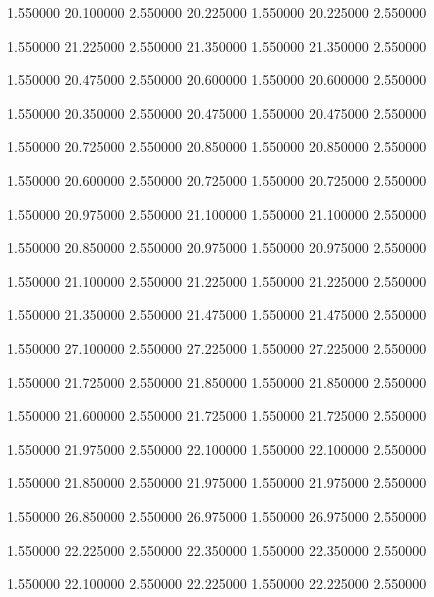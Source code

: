  {1.550000} {20.100000} {2.550000} {20.225000} {1.550000} {20.225000} {2.550000}

 {1.550000} {21.225000} {2.550000} {21.350000} {1.550000} {21.350000} {2.550000}

 {1.550000} {20.475000} {2.550000} {20.600000} {1.550000} {20.600000} {2.550000}

 {1.550000} {20.350000} {2.550000} {20.475000} {1.550000} {20.475000} {2.550000}

 {1.550000} {20.725000} {2.550000} {20.850000} {1.550000} {20.850000} {2.550000}

 {1.550000} {20.600000} {2.550000} {20.725000} {1.550000} {20.725000} {2.550000}

 {1.550000} {20.975000} {2.550000} {21.100000} {1.550000} {21.100000} {2.550000}

 {1.550000} {20.850000} {2.550000} {20.975000} {1.550000} {20.975000} {2.550000}

 {1.550000} {21.100000} {2.550000} {21.225000} {1.550000} {21.225000} {2.550000}

 {1.550000} {21.350000} {2.550000} {21.475000} {1.550000} {21.475000} {2.550000}

 {1.550000} {27.100000} {2.550000} {27.225000} {1.550000} {27.225000} {2.550000}

 {1.550000} {21.725000} {2.550000} {21.850000} {1.550000} {21.850000} {2.550000}

 {1.550000} {21.600000} {2.550000} {21.725000} {1.550000} {21.725000} {2.550000}

 {1.550000} {21.975000} {2.550000} {22.100000} {1.550000} {22.100000} {2.550000}

 {1.550000} {21.850000} {2.550000} {21.975000} {1.550000} {21.975000} {2.550000}

 {1.550000} {26.850000} {2.550000} {26.975000} {1.550000} {26.975000} {2.550000}

 {1.550000} {22.225000} {2.550000} {22.350000} {1.550000} {22.350000} {2.550000}

 {1.550000} {22.100000} {2.550000} {22.225000} {1.550000} {22.225000} {2.550000}

